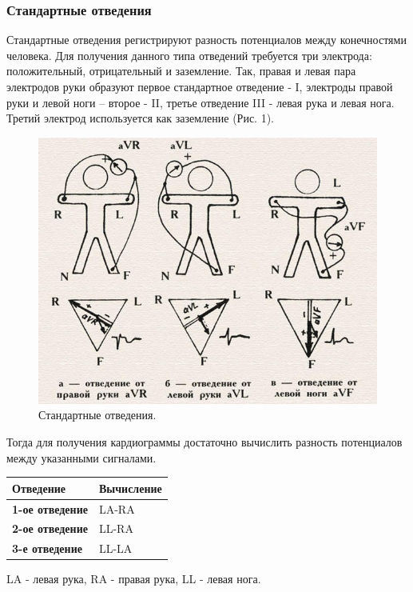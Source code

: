 \documentclass[12pt, russian]{extarticle}
\begin{document}
\begin{spacing}{1.5}
\subsubsection{Стандартные отведения}

Стандартные отведения регистрируют разность потенциалов между конечностями человека. Для получения данного типа отведений требуется три электрода: положительный, отрицательный и заземление. Так, правая и левая пара электродов руки образуют первое стандартное отведение - I, электроды правой руки и левой ноги – второе - II, третье отведение III - левая рука и левая нога. Третий электрод используется как заземление (Рис. 1).

\begin{figure}[htbp]
\centering
\includegraphics[scale=0.44]{resources/отведения экг.jpg}
\caption{Стандартные отведения.}
\end{figure}

Тогда для получения кардиограммы достаточно вычислить разность потенциалов между указанными сигналами.

\begin{center}
\begin{tabular}{|l|l|}
\hline
\textbf{Отведение}      & \textbf{Вычисление} \\ \hline
\textbf{1-ое отведение} & LA-RA               \\ \hline
\textbf{2-ое отведение} & LL-RA               \\ \hline
\textbf{3-е отведение}  & LL-LA               \\ \hline
\end{tabular} \bigbreak
LA - левая рука, RA - правая рука, LL - левая нога.
\end{center}


\end{spacing}
\end{document}
